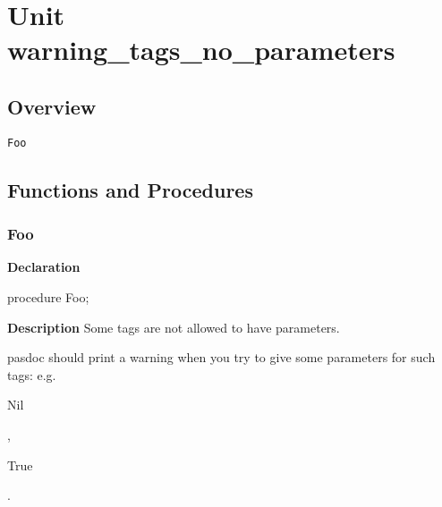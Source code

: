 \documentclass{report}
\newif\ifpdf
\begin{document}
\chapter{Unit warning{\_}tags{\_}no{\_}parameters}
\label{warning_tags_no_parameters}
\section{Overview}
\begin{description}
\item[\texttt{Foo}]
\end{description}
\section{Functions and Procedures}
\ifpdf
\subsection*{\large{\textbf{Foo}}\normalsize\hspace{1ex}\hrulefill}
\else
\subsection*{Foo}
\fi
\label{warning_tags_no_parameters-Foo}
\begin{list}{}{
\setlength{\itemindent}{0cm}
\setlength{\listparindent}{0cm}
\setlength{\leftmargin}{\evensidemargin}
\addtolength{\leftmargin}{\tmplength}
\settowidth{\labelsep}{X}
\addtolength{\leftmargin}{\labelsep}
\setlength{\labelwidth}{\tmplength}
}
\item[\textbf{Declaration}\hfill]
\ifpdf
\begin{flushleft}
\fi
\begin{ttfamily}
procedure Foo;\end{ttfamily}

\ifpdf
\end{flushleft}
\fi

\par
\item[\textbf{Description}]
Some tags are not allowed to have parameters.

pasdoc should print a warning when you try to give some parameters for such tags: e.g. \begin{ttfamily}Nil\end{ttfamily}, \begin{ttfamily}True\end{ttfamily}.

\end{list}
\end{document}
